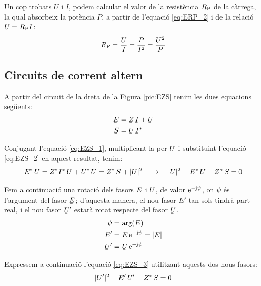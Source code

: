 Un cop trobats $U$ i $I$, podem calcular el valor de la resist\`{e}ncia
$R_\mathrm{P}$ de la c\`{a}rrega, la qual absorbeix la pot\`{e}ncia $P$, a
partir de l'equaci\'{o} \eqref{eq:ERP_2} i de la relaci\'{o} $U =R_\mathrm{P}
I$:
\begin{equation}
   R_\mathrm{P} = \frac{U}{I} = \frac{P}{I^2} = \frac{U^2}{P}
\end{equation}

\subsection{Circuits de corrent altern}

A partir del circuit de la dreta de la Figura \vref{pic:EZS} tenim les dues equacions seg\"{u}ents:
\begin{align}
   \cmplx{E} &= \cmplx{Z} \, \cmplx{I} + \cmplx{U} \label{eq:EZS_1} \\
   \cmplx{S} &= \cmplx{U} \, \cmplx{I}^*           \label{eq:EZS_2}
\end{align}

Conjugant l'equaci\'{o} \eqref{eq:EZS_1}, multiplicant-la per $\cmplx{U}$ i substituint l'equaci\'{o} \eqref{eq:EZS_2} en aquest resultat, tenim:
\begin{equation}
   \cmplx{E}^* \, \cmplx{U} = \cmplx{Z}^* \cmplx{I}^* \, \cmplx{U} + \cmplx{U}^* \, \cmplx{U} =
   \cmplx{Z}^* \, \cmplx{S} + |\cmplx{U}|^2 \quad \rightarrow \quad
   |\cmplx{U}|^2 - \cmplx{E}^* \, \cmplx{U} + \cmplx{Z}^* \, \cmplx{S} = 0
   \label{eq:EZS_3}
\end{equation}

Fem a continuaci\'{o} una rotaci\'{o} dels fasors $\cmplx{E}$ i
$\cmplx{U}$, de valor $\mathrm{e}^{-\mathrm{j}\psi}$, on $\psi$ \'{e}s l'argument
del fasor $\cmplx{E}$; d'aquesta manera, el nou fasor $E'$ tan
sols tindr\`{a} part real, i el nou fasor $\cmplx{U}'$ estar\`{a} rotat
respecte del fasor $\cmplx{U}$.
\begin{align}
   \psi &= \arg(\cmplx{E}) \label{eq:EZS_9} \\
   E' &= \cmplx{E} \, \eu^{-\ju\psi} = |\cmplx{E}|  \label{eq:EZS_4} \\
   \cmplx{U}' &= \cmplx{U} \, \eu^{-\ju\psi}   \label{eq:EZS_5}
\end{align}

Expressem a continuaci\'{o} l'equaci\'{o} \eqref{eq:EZS_3} utilitzant
aquests dos nous fasors:
\begin{equation}
   |\cmplx{U}'|^2 - E' \, \cmplx{U}' + \cmplx{Z}^* \, \cmplx{S} = 0 \label{eq:EZS_6}
\end{equation}

